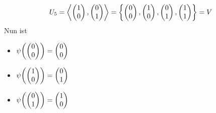 \documentclass{scrreprt}
\begin{document}
\begin{enumerate}[(i)]
\[    U_5 = \left\langle
      \begin{pmatrix}1\\0\end{pmatrix},
      \begin{pmatrix}0\\1\end{pmatrix}
    \right\rangle = \qty{
      \begin{pmatrix}0\\0\end{pmatrix},
      \begin{pmatrix}1\\0\end{pmatrix},
      \begin{pmatrix}0\\1\end{pmatrix},
      \begin{pmatrix}1\\1\end{pmatrix}
    } = V
  \]
  Nun ist
  \begin{multicols}{2}
  \begin{itemize}
  \item $\psi\qty(
      \begin{pmatrix}0\\0\end{pmatrix}
    ) = \begin{pmatrix}0\\0\end{pmatrix}$

  \item $\psi\qty(
      \begin{pmatrix}1\\0\end{pmatrix}
    ) = \begin{pmatrix}0\\1\end{pmatrix}$

  \item $\psi\qty(
      \begin{pmatrix}0\\1\end{pmatrix}
    ) = \begin{pmatrix}1\\0\end{pmatrix}$


\end{itemize}
\end{multicols}
\end{enumerate}
\end{document}
